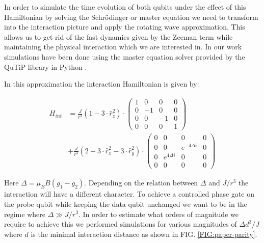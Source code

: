 In order to simulate the time evolution of both qubits under the effect of this Hamiltonian by solving the Schr\"odinger or master equation we need to transform into the interaction picture and apply the rotating wave approximation. This allows us to get rid of the fast dynamics given by the Zeeman term while maintaining the physical interaction which we are interested in. In our work simulations have been done using the master equation solver provided by the QuTiP library in Python \cite{Johansson2012,Johansson2013}.

In this approximation the interaction Hamiltonian is given by:

\begin{align*}
	H_{int}&= \frac{J}{r^3} (1-3 \cdot \hat{r}_z^2) \cdot
	\begin{pmatrix}
	1 & 0 & 0 & 0 \\
	0 & -1 & 0 & 0 \\
	0 & 0 & -1 & 0 \\
	0 & 0 & 0 & 1 
	\end{pmatrix} \\
	&+ \frac{J}{r^3} (2-3 \cdot \hat{r}_x^2 -3 \cdot \hat{r}_y^2) \cdot
	\begin{pmatrix}
	0 & 0 & 0 & 0 \\
	0 & 0 & e^{-4 \Delta i} & 0 \\
	0 & e^{4 \Delta i} & 0 & 0 \\
	0 & 0 & 0 & 0 
	\end{pmatrix}
\end{align*}

Here $\Delta=\mu_B B (g_1-g_2)$. Depending on the relation between $\Delta$ and $J/r^3$ the interaction will have a different character. 
To achieve a controlled phase gate on the probe qubit while keeping the data qubit unchanged we want to be in the regime where $\Delta \gg J/r^3$.
In order to estimate what orders of magnitude we require to achieve this we performed simulations for various magnitudes of $\Delta d^3/ J$ where $d$ is the minimal interaction distance as shown in FIG. \ref{FIG:paper-parity}.

